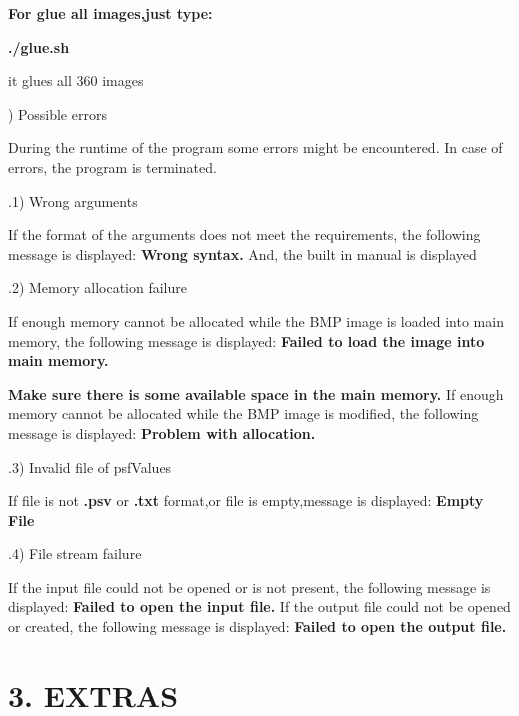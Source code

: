 \documentclass{article}
\begin{document}
\textbf{For glue all images,just type:}

   \textbf{./glue.sh} 
   
   it glues all 360 images

) Possible errors

During the runtime of the program some errors might be encountered. In case of errors, the program is terminated.

.1) Wrong arguments

If the format of the arguments does not meet the requirements, the following message is displayed:\newline
\indent\textbf{Wrong syntax.}\newline
And, the built in manual is displayed

.2) Memory allocation failure

If enough memory cannot be allocated while the BMP image is loaded into main memory, the following message is displayed:\newline
\indent\textbf{Failed to load the image into main memory.}\newline 

\indent\textbf{Make sure there is some available space in the main memory.}\newline
If enough memory cannot be allocated while the BMP image is modified, the following message is displayed:\newline
\indent\textbf{Problem with allocation.}\newline


.3) Invalid file of psfValues

If file is not \textbf{.psv} or \textbf{.txt} format,or file is empty,message is displayed:\newline
\indent\textbf{ Empty File }\newline


.4) File stream failure

If the input file could not be opened or is not present, the following message is displayed:\newline
\indent\textbf{Failed to open the input file.}\newline
If the output file could not be opened or created, the following message is displayed:\newline
\indent\textbf{Failed to open the output file.}\newline


\section*{3. EXTRAS}
\end{document}
